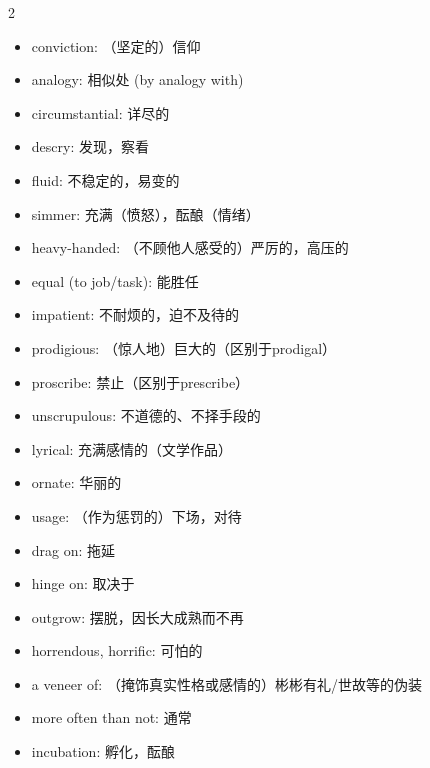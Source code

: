 \documentclass[11pt,space]{ctexart}
\begin{document}
\begin{multicols}{2}
\begin{itemize}
    \item conviction: （坚定的）信仰
    \item analogy: 相似处 (by analogy with)
    \item circumstantial: 详尽的
    \item descry: 发现，察看
    \item fluid: 不稳定的，易变的
    \item simmer: 充满（愤怒），酝酿（情绪）
    \item heavy-handed: （不顾他人感受的）严厉的，高压的
    \item equal (to job/task): 能胜任
    \item impatient: 不耐烦的，迫不及待的
    \item prodigious: （惊人地）巨大的（区别于prodigal）
    \item proscribe: 禁止（区别于prescribe）
    \item unscrupulous: 不道德的、不择手段的
    \item lyrical: 充满感情的（文学作品）
    \item ornate: 华丽的
    \item usage: （作为惩罚的）下场，对待
    \item drag on: 拖延
    \item hinge on: 取决于
    \item outgrow: 摆脱，因长大成熟而不再
    \item horrendous, horrific: 可怕的
    \item a veneer of: （掩饰真实性格或感情的）彬彬有礼/世故等的伪装
    \item more often than not: 通常
    \item incubation: 孵化，酝酿
\end{itemize}

\end{multicols}
\end{document}
